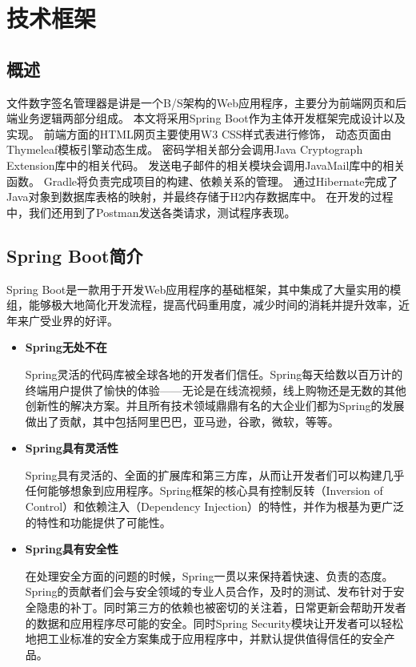 
\chapter{技术框架}

\section{概述}

文件数字签名管理器是讲是一个B/S架构的Web应用程序，主要分为前端网页和后端业务逻辑两部分组成。
本文将采用Spring Boot\cite{springboot}作为主体开发框架完成设计以及实现。
前端方面的HTML网页主要使用W3 CSS\cite{w3css}样式表进行修饰，
动态页面由Thymeleaf\cite{thymeleaf}模板引擎动态生成。
密码学相关部分会调用Java Cryptograph Extension\cite{jce}库中的相关代码。
发送电子邮件的相关模块会调用JavaMail\cite{javamail}库中的相关函数。
Gradle\cite{gradle}将负责完成项目的构建、依赖关系的管理。
通过Hibernate\cite{hibernate}完成了Java对象到数据库表格的映射，并最终存储于H2\cite{h2}内存数据库中。
在开发的过程中，我们还用到了Postman\cite{postman}发送各类请求，测试程序表现。


\section{Spring Boot简介}

Spring Boot是一款用于开发Web应用程序的基础框架，其中集成了大量实用的模组，能够极大地简化开发流程，提高代码重用度，减少时间的消耗并提升效率，近年来广受业界的好评。

\begin{itemize}
	\item \textbf{Spring无处不在}
	
	Spring灵活的代码库被全球各地的开发者们信任。Spring每天给数以百万计的终端用户提供了愉快的体验——无论是在线流视频，线上购物还是无数的其他创新性的解决方案。并且所有技术领域鼎鼎有名的大企业们都为Spring的发展做出了贡献，其中包括阿里巴巴，亚马逊，谷歌，微软，等等。
	
	\item \textbf{Spring具有灵活性}
	
	Spring具有灵活的、全面的扩展库和第三方库，从而让开发者们可以构建几乎任何能够想象到应用程序。Spring框架的核心具有控制反转（Inversion of Control）和依赖注入（Dependency Injection）的特性，并作为根基为更广泛的特性和功能提供了可能性。
	
	\item \textbf{Spring具有安全性}
	
	在处理安全方面的问题的时候，Spring一贯以来保持着快速、负责的态度。Spring的贡献者们会与安全领域的专业人员合作，及时的测试、发布针对于安全隐患的补丁。同时第三方的依赖也被密切的关注着，日常更新会帮助开发者的数据和应用程序尽可能的安全。同时Spring Security模块让开发者可以轻松地把工业标准的安全方案集成于应用程序中，并默认提供值得信任的安全产品。
	
\end{itemize}

